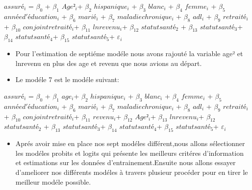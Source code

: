 \documentclass[
  14pt,
  french,
]{article}
\providecommand{\tightlist}{%
  \setlength{\itemsep}{0pt}\setlength{\parskip}{0pt}}
\begin{document}
\begin{center}
$assuré_i$ = $\beta_0$  + $\beta_1$ $Age²_i$+ $\beta_2$ $hispanique_i$ + $\beta_3$ $blanc_i$ + $\beta_4$ $femme_i$  + $\beta_{5}$ $année d'éducation_i$ + $\beta_{6}$ $marié_i$ + $\beta_7$ $maladie chronique_i$  + $\beta_{8}$ $adl_i$ + $\beta_{9}$ $retraité_i$ + $\beta_{10}$ $conjoint retraité_i$+ $\beta_{11}$ $lnrevenu_i$+ $\beta_{12}$ $statut santé_2$ + $\beta_{13}$ $statut santé_3$+ $\beta_{14}$ $statut santé_4$+ $\beta_{15}$ $statut santé_5$+ $\varepsilon_i$
\end{center}

\begin{itemize}
\item
  Pour l'estimation de septiéme modéle nous avons rajouté la variable
  age² et lnrevenu en plus des age et revenu que nous avions au départ.
\item
  Le modéle 7 est le modéle suivant:
\end{itemize}

\begin{center}
$assuré_i$ = $\beta_0$  + $\beta_1$ $age_i$+ $\beta_2$ $hispanique_i$ + $\beta_3$ $blanc_i$ + $\beta_4$ $femme_i$  + $\beta_{5}$ $année d'éducation_i$ + $\beta_{6}$ $marié_i$ + $\beta_7$ $maladie chronique_i$  + $\beta_{8}$ $adl_i$ + $\beta_{9}$ $retraité_i$ + $\beta_{10}$ $conjoint retraité_i$+ $\beta_{11}$ $revenu_i$+ $\beta_{12}$ $Age²_i$+ $\beta_{13}$ $lnrevenu_i$+ $\beta_{12}$ $statut santé_2$ + $\beta_{13}$ $statut santé_3$+ $\beta_{14}$ $statut santé_4$+ $\beta_{15}$ $statut santé_5$+ $\varepsilon_i$ 
\end{center}

\begin{itemize}
\tightlist
\item
  Aprés avoir mise en place nos sept modéles différent,nous allons
  sélectionner les modéles probits et logits qui présente les meilleurs
  critéres d'information et estimations sur les données
  d'entrainement.Ensuite nous allons essayer d'ameliorer nos différents
  modéles à travers plusieur procéder pour en tirer le meilleur modéle
  possible.
\end{itemize}

\linebreak
\end{document}
